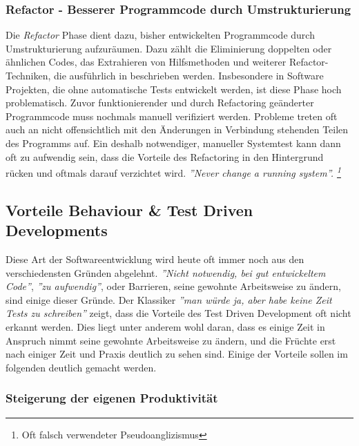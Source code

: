 \subsubsection{Refactor - Besserer Programmcode durch
  Umstrukturierung}

Die \textit{Refactor} Phase dient dazu, bisher entwickelten
Programmcode durch Umstrukturierung aufzuräumen. Dazu zählt die
Eliminierung doppelten oder ähnlichen Codes, das Extrahieren von
Hilfsmethoden und weiterer Refactor-Techniken, die ausführlich in
\cite{fowler99refactoring} beschrieben werden. Insbesondere in
Software Projekten, die ohne automatische Tests entwickelt werden, ist
diese Phase hoch problematisch. Zuvor funktionierender und durch
Refactoring geänderter Programmcode muss nochmals manuell verifiziert
werden. Probleme treten oft auch an nicht offensichtlich mit den
Änderungen in Verbindung stehenden Teilen des Programms auf. Ein
deshalb notwendiger, manueller Systemtest kann dann oft zu aufwendig
sein, dass die Vorteile des Refactoring in den Hintergrund rücken und
oftmals darauf verzichtet wird.  \textit{''Never change a running
  system''. \footnote{Oft falsch verwendeter Pseudoanglizismus}}

\subsection{Vorteile Behaviour \& Test Driven Developments}

Diese Art der Softwareentwicklung wird heute oft immer noch aus den
verschiedensten Gründen abgelehnt. \textit{''Nicht notwendig, bei gut
  entwickeltem Code''}, \textit{''zu aufwendig''}, oder Barrieren,
seine gewohnte Arbeitsweise zu ändern, sind einige dieser Gründe. Der
Klassiker \textit{''man würde ja, aber habe keine Zeit Tests zu
  schreiben''} zeigt, dass die Vorteile des Test Driven Development
oft nicht erkannt werden. Dies liegt unter anderem wohl daran, dass es
einige Zeit in Anspruch nimmt seine gewohnte Arbeitsweise zu ändern,
und die Früchte erst nach einiger Zeit und Praxis deutlich zu sehen
sind. Einige der Vorteile sollen im folgenden deutlich gemacht werden.

\subsubsection{Steigerung der eigenen Produktivität}

